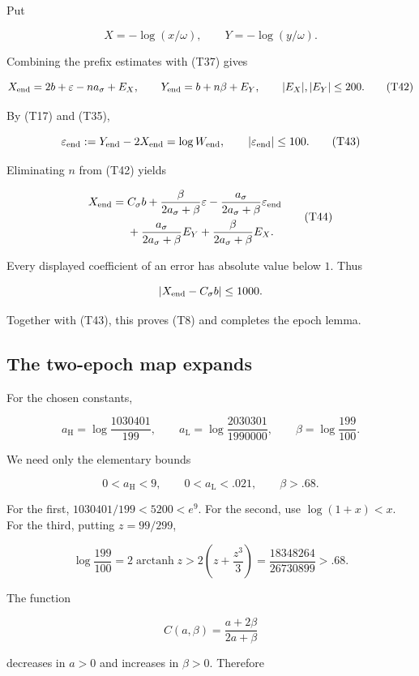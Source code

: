 Put

\[
X=-\log(x/\omega),\qquad Y=-\log(y/\omega).
\]

Combining the prefix estimates with (T37) gives

\[
X_{\rm end}=2b+\varepsilon-na_\sigma+E_X,
\qquad
Y_{\rm end}=b+n\beta+E_Y,
\qquad
|E_X|,|E_Y|\le200.
\tag{T42}
\]

By (T17) and (T35),

\[
\varepsilon_{\rm end}:=Y_{\rm end}-2X_{\rm end}
=\log W_{\rm end},
\qquad |\varepsilon_{\rm end}|\le100.
\tag{T43}
\]

Eliminating \(n\) from (T42) yields

\[
\begin{aligned}
X_{\rm end}
={}&C_\sigma b
+\frac{\beta}{2a_\sigma+\beta}\varepsilon
-\frac{a_\sigma}{2a_\sigma+\beta}\varepsilon_{\rm end}\\
&+\frac{a_\sigma}{2a_\sigma+\beta}E_Y
+\frac{\beta}{2a_\sigma+\beta}E_X.
\end{aligned}
\tag{T44}
\]

Every displayed coefficient of an error has absolute value below \(1\). Thus

\[
|X_{\rm end}-C_\sigma b|\le1000.
\]

Together with (T43), this proves (T8) and completes the epoch lemma.



\subsection{The two-epoch map expands}

For the chosen constants,

\[
a_{\mathrm H}=\log\frac{1030401}{199},
\qquad
a_{\mathrm L}=\log\frac{2030301}{1990000},
\qquad
\beta=\log\frac{199}{100}.
\tag{T45}
\]

We need only the elementary bounds

\[
0<a_{\mathrm H}<9,\qquad
0<a_{\mathrm L}<.021,\qquad
\beta>.68.
\tag{T46}
\]

For the first, \(1030401/199<5200<e^9\).
For the second, use \(\log(1+x)<x\).
For the third, putting \(z=99/299\),

\[
\log\frac{199}{100}
=2\operatorname{arctanh}z
>2\left(z+\frac{z^3}{3}\right)
=\frac{18348264}{26730899}>.68.
\]

The function

\[
C(a,\beta)=\frac{a+2\beta}{2a+\beta}
\]

decreases in \(a>0\) and increases in \(\beta>0\). Therefore

